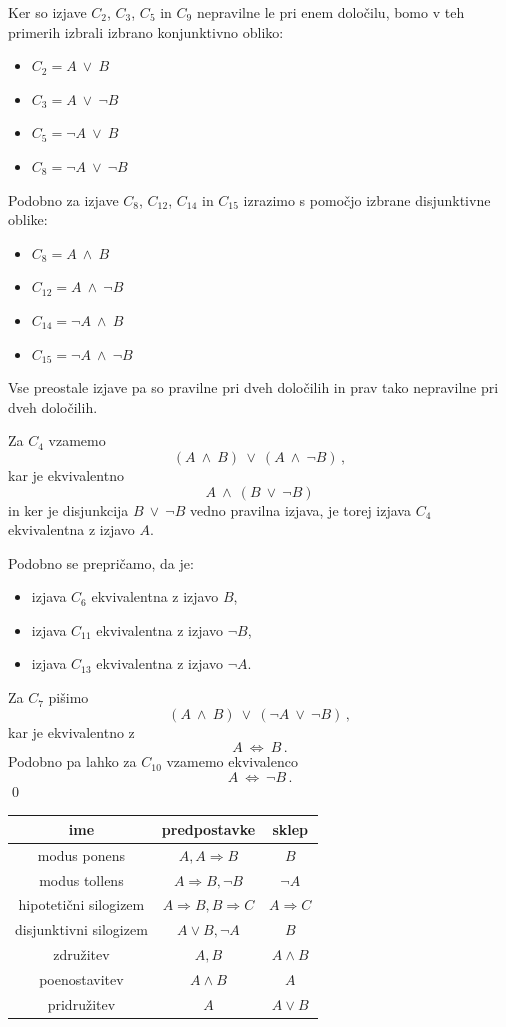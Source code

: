 \documentclass[11pt,paper=b5,footinclude,headinclude]{scrbook} %
\def\ali {{~\vee~}}
\def\inn {{~\wedge~}}
\def\cee {{~\Leftrightarrow~}}
\begin{document}
Ker so izjave $C_2$, $C_3$, $C_5$ in $C_9$ nepravilne le pri enem določilu, bomo v teh primerih izbrali
izbrano konjunktivno obliko:
\begin{itemize}
  \item $C_2 = A\ali B$
  \item $C_3 = A\ali \neg B$
  \item $C_5 = \neg A\ali B$
  \item $C_8 = \neg A\ali \neg B$
\end{itemize}
Podobno za izjave $C_{8}$, $C_{12}$, $C_{14}$ in $C_{15}$ izrazimo s pomočjo izbrane disjunktivne oblike:
\begin{itemize}
  \item $C_8 = A\inn B$
  \item $C_{12} = A\inn\neg B$
  \item $C_{14} = \neg A\inn B$
  \item $C_{15} = \neg A\inn\neg B$
\end{itemize}
Vse preostale izjave pa so pravilne pri dveh določilih in prav tako nepravilne pri dveh določilih.

Za $C_4$ vzamemo $$(A\inn B) \ali (A\inn \neg B)\,,$$
kar je ekvivalentno
$$A\inn (B \ali \neg B)$$
in ker je disjunkcija $B \ali \neg B$ vedno pravilna izjava, je torej izjava $C_4$ ekvivalentna z izjavo $A$.

Podobno se prepričamo, da je:
\begin{itemize}
  \item  izjava $C_6$ ekvivalentna z izjavo $B$,
  \item  izjava $C_{11}$ ekvivalentna z izjavo $\neg B$,
  \item  izjava $C_{13}$ ekvivalentna z izjavo $\neg A$.
\end{itemize}
Za $C_7$ pišimo
$$(A\inn B) \ali (\neg A\ali \neg B)\,,$$
kar je ekvivalentno z
$$A\cee B\,.$$
Podobno pa lahko za $C_{10}$ vzamemo ekvivalenco
$$A\cee \neg B\,.$$
\qed


\begin{tabular}{|c|c|c|}
	\hline 
	ime & predpostavke & sklep\\
	\hline 
	\hline 
	modus ponens & $A,A\Rightarrow B$ & $B$\\
	\hline 
	modus tollens & $A\Rightarrow B,\neg B$ & $\neg A$\\
	\hline 
	hipoteti\v{c}ni silogizem & $A\Rightarrow B,B\Rightarrow C$ & $A\Rightarrow C$\\
	\hline 
	disjunktivni silogizem & $A\vee B,\neg A$ & $B$\\
	\hline 
	združitev  & $A,B$ & $A\wedge B$\\
	\hline 
	poenostavitev & $A\wedge B$ & $A$\\
	\hline 
	pridružitev & $A$ & $A\vee B$\\
	\hline 
\end{tabular}
\end{document}
